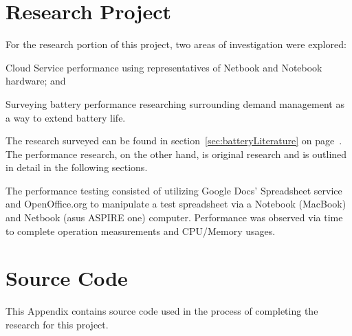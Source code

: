 \documentclass[12pt,oneside,letterpaper,titlepage]{report}
\begin{document}
  

\chapter{Research Project}

For the research portion of this project, two areas of investigation were explored:
\begin{inparaenum}[(1)]
\item Cloud Service performance using representatives of Netbook and Notebook
  hardware; and
\item Surveying battery performance researching surrounding demand management as
  a way to extend battery life.
\end{inparaenum}
The research surveyed can be found in section~\ref{sec:batteryLiterature} on
page~\pageref{sec:batteryLiterature}.  The performance research, on the other
hand, is original research and is outlined in detail in the following sections.

The performance testing consisted of utilizing Google Docs' Spreadsheet service
and OpenOffice.org to manipulate a test spreadsheet via a Notebook (MacBook) and
Netbook (asus ASPIRE one) computer.  Performance was observed via time to
complete operation measurements and CPU/Memory usages.

  

  

  

  

\appendix

\chapter{Source Code}

This Appendix contains source code used in the process of completing the
research for this project.

\newpage

\label{sourceCode}



\newpage


\end{document}
